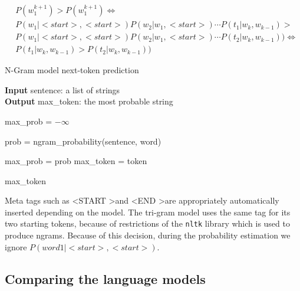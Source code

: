 \documentclass[11pt, a4paper]{article}
\begin{document}
	\begin{equation}
		\label{eq::trigram_sentence_probs}
		\begin{aligned}
			& P(w^{k+1}_1) > P(w^{k+1}_1) \iff \\
			& P(w_1|<start>, <start>) P(w_2|w_1, <start>) \cdots P(t_1|w_k, w_{k-1}) > \\ & P(w_1|<start>, <start>) P(w_2|w_1, <start>) \cdots P(t_2|w_k, w_{k-1})) \iff \\
			& P(t_1|w_k, w_{k-1}) > P(t_2|w_k, w_{k-1}))
		\end{aligned}
	\end{equation}
	
	
	
	\begin{algorithm}
		\caption{N-Gram model next-token prediction} 
		\label{al::next_token}
		
		\hspace*{\algorithmicindent} \textbf{Input} sentence: a list of strings\\
		\hspace*{\algorithmicindent} \textbf{Output} max\_token: the most probable string
		\begin{algorithmic}[1]
			
			\State max\_prob = $-\infty$
			
			
					\State prob = ngram\_probability(sentence, word)
					
						\State max\_prob = prob
						\State max\_token = token
					\EndIf
				
				\EndIf
			
			\EndFor
			
			\State \Return max\_token
		\end{algorithmic} 
	\end{algorithm}
	
	
	Meta tags such as \textless START \textgreater  and \textless END \textgreater  are appropriately automatically inserted depending on the model. The tri-gram model uses the same tag for its two starting tokens, because of restrictions of the \texttt{nltk} library which is used to produce ngrams. Because of this decision, during the probability estimation we ignore $P(word1 | <start>, <start>)$.
	
	
	\subsection{Comparing the language models}
	
\end{document}
